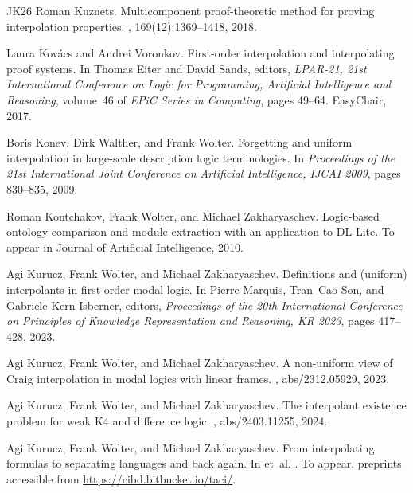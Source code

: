 \documentclass[10pt,a4paper]{amsart}
\theoremstyle{plain}
\theoremstyle{definition}
\begin{document}
\begin{thebibliography}{{}JK{\etalchar{+}}26}
Roman Kuznets.
\newblock Multicomponent proof-theoretic method for proving interpolation properties.
, 169(12):1369--1418, 2018.

Laura Kov{\'{a}}cs and Andrei Voronkov.
\newblock First-order interpolation and interpolating proof systems.
\newblock In Thomas Eiter and David Sands, editors, {\em LPAR-21, 21st International Conference on Logic for Programming, Artificial Intelligence and Reasoning}, volume~46 of {\em EPiC Series in Computing}, pages 49--64. EasyChair, 2017.

Boris Konev, Dirk Walther, and Frank Wolter.
\newblock Forgetting and uniform interpolation in large-scale description logic terminologies.
\newblock In {\em Proceedings of the 21st International Joint Conference on Artificial Intelligence, {IJCAI} 2009}, pages 830--835, 2009.

Roman Kontchakov, Frank Wolter, and Michael Zakharyaschev.
\newblock Logic-based ontology comparison and module extraction with an application to {D}{L}-{L}ite.
\newblock To appear in Journal of Artificial Intelligence, 2010.

Agi Kurucz, Frank Wolter, and Michael Zakharyaschev.
\newblock Definitions and (uniform) interpolants in first-order modal logic.
\newblock In Pierre Marquis, Tran~Cao Son, and Gabriele Kern{-}Isberner, editors, {\em Proceedings of the 20th International Conference on Principles of Knowledge Representation and Reasoning, {KR} 2023}, pages 417--428, 2023.

Agi Kurucz, Frank Wolter, and Michael Zakharyaschev.
\newblock A non-uniform view of {C}raig interpolation in modal logics with linear frames.
, abs/2312.05929, 2023.

Agi Kurucz, Frank Wolter, and Michael Zakharyaschev.
\newblock The interpolant existence problem for weak {K4} and difference logic.
, abs/2403.11255, 2024.

Agi Kurucz, Frank Wolter, and Michael Zakharyaschev.
\newblock From interpolating formulas to separating languages and back again.
\newblock In {} et~al. \cite{taci}.
\newblock To appear, preprints accessible from \url{https://cibd.bitbucket.io/taci/}.


\end{thebibliography}
\end{document}
